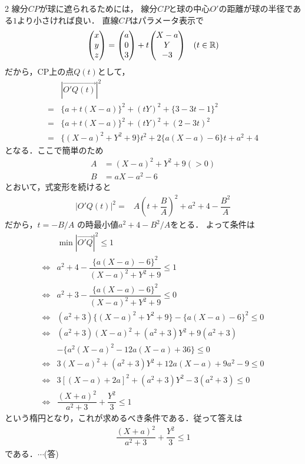 \documentclass[../../main.tex]{subfiles}
\begin{document}
\begin{multicols}{2}
  線分$CP$が球に遮られるためには，
  線分$CP$と球の中心$O'$の距離が球の半径である$1$より小さければ良い．
  直線$CP$はパラメータ表示で
  \begin{align}
    \mqty(x   \\y \\ z)
    = \mqty(a \\ 0 \\ 3) + t \mqty(X-a \\ Y \\ -3)\quad (t \in \mathbb{R})
  \end{align}
  だから，CP上の点$Q(t)$として，
  \begin{align}
    & |\overrightarrow{O'Q(t)}|^2                              \\
    = & \{ a+t(X-a) \}^2 + (tY)^2 + \{ 3-3t-1 \}^2    \\
    = & \{ a+t(X-a) \}^2 + (tY)^2 + (2-3t)^2          \\
    = & \{(X-a)^2+Y^2+9\}t^2 + 2\{a(X-a)-6\}t + a^2+4
  \end{align}
  となる．ここで簡単のため
  \begin{align}
    A & =(X-a)^2+Y^2+9(>0) \\
    B & =aX-a^2-6
  \end{align}
  とおいて，式変形を続けると
  \begin{align}
    |O'Q(t)|^2= & A\left(t+\dfrac{B}{A}\right)^2+a^2+4-\dfrac{B^2}{A}
  \end{align}
  だから，$t = - B/A$ の時最小値$a^2+4-B^2/A$をとる．
  よって条件は
  \begin{align}
    & \min |\overrightarrow{O'Q}|^2 \le 1                                    \\
    \Leftrightarrow & a^2+4 - \dfrac{\{a(X-a)-6\}^2}{(X-a)^2+Y^2+9} \le 1          \\
    \Leftrightarrow & a^2+3 - \dfrac{\{a(X-a)-6\}^2}{(X-a)^2+Y^2+9} \le 0          \\
    \Leftrightarrow & (a^2+3) \{(X-a)^2+Y^2+9\} - \{a(X-a)-6\}^2 \le 0            \\
    \Leftrightarrow & (a^2+3)(X-a)^2+(a^2+3)Y^2+9(a^2+3)                          \\
    & - \{a^2(X-a)^2-12a(X-a)+36\} \le 0   \\
    \Leftrightarrow & 3(X-a)^2+(a^2+3)Y^2+12a(X-a)+9a^2-9 \le 0                   \\
    \Leftrightarrow & 3\left[(X-a)+2a\right]^2+(a^2+3)Y^2-3(a^2+3) \le 0 \\
    \Leftrightarrow & \dfrac{(X+a)^2}{a^2+3} + \dfrac{Y^2}{3} \le 1
  \end{align}
  という楕円となり，これが求めるべき条件である．従って答えは
  \begin{align}
    \dfrac{(X+a)^2}{a^2+3} + \dfrac{Y^2}{3} \le 1
  \end{align}
  である．$\cdots$(答)


\end{multicols}
\end{document}
